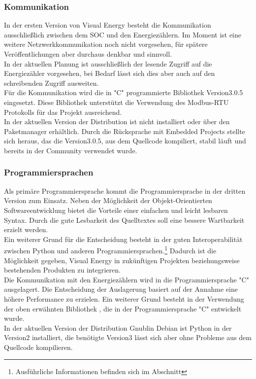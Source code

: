 \documentclass[Bachelorarbeit.tex]{subfiles}
\begin{document}
\subsubsection*{Kommunikation}
In der ersten Version von Visual Energy besteht die Kommunikation ausschließlich 
zwischen dem \ac{SOC} und den Energiezählern. 
Im Moment ist eine weitere Netzwerkkommunikation noch nicht vorgesehen, für spätere Veröffentlichungen aber durchaus denkbar und sinnvoll.\\
In der aktuellen Planung ist ausschließlich der lesende Zugriff auf die Energiezähler vorgesehen, bei Bedarf lässt sich dies aber auch auf den schreibenden Zugriff ausweiten.\\
Für die Kommunikation wird die in "C" programmierte Bibliothek  Version3.0.5 eingesetzt. 
Diese Bibliothek unterstützt die Verwendung des Modbus-RTU Protokolls für 
das Projekt ausreichend. \\
In der aktuellen Version der Distribution  ist  nicht installiert oder über den Paketmanager erhältlich. Durch die Rücksprache mit Embedded Projects
stellte sich heraus, das die  Version3.0.5, aus dem Quellcode kompiliert, stabil läuft und bereits in der Community verwendet wurde.

\subsubsection*{Programmiersprachen}
Als primäre Programmiersprache kommt die Programmiersprache  in der dritten 
Version zum Einsatz. Neben der Möglichkeit der Objekt-Orientierten Softwareentwicklung 
bietet  die Vorteile einer einfachen und leicht lesbaren Syntax. Durch die gute 
Lesbarkeit des Quelltextes soll eine bessere Wartbarkeit erzielt werden. \\
Ein weiterer Grund für die Entscheidung besteht in der guten Interoperabilität zwischen 
Python und anderen Programmiersprachen.\footnote{Ausführliche Informationen befinden sich im  Abschnitt } Dadurch ist die Möglichkeit gegeben, Visual 
Energy in zukünftigen Projekten beziehungsweise bestehenden Produkten zu integrieren.\\
Die Kommunikation mit den Energiezählern wird in die Programmiersprache "C" 
ausgelagert. Die Entscheidung der Auslagerung basiert auf der Annahme eine höhere 
Performance zu erzielen. Ein weiterer Grund besteht in der Verwendung der oben 
erwähnten Bibliothek , die in der Programmiersprache "C" entwickelt wurde.\\
In der aktuellen Version der Distribution Gnublin Debian ist Python in der Version2 installiert, die benötigte Version3 lässt sich aber ohne Probleme aus dem Quellcode kompilieren.
\end{document}
